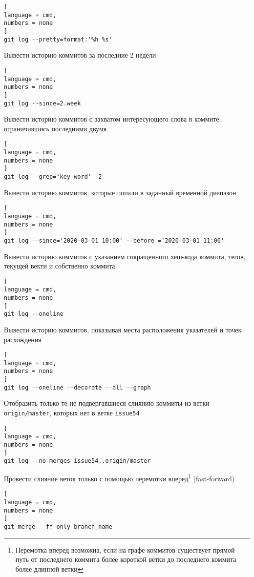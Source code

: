 \documentclass[%
	11pt,
	a4paper,
	utf8,
		]{article}
\begin{document}
\begin{lstlisting}[
language = cmd,
numbers = none
]
git log --pretty=format:'%h %s'
\end{lstlisting}


Вывести историю коммитов за последние 2 недели

\begin{lstlisting}[
language = cmd,
numbers = none
]
git log --since=2.week
\end{lstlisting}


Вывести историю коммитов с захватом интересующего слова в коммите, ограничившись последними двумя

\begin{lstlisting}[
language = cmd,
numbers = none
]
git log --grep='key word' -2
\end{lstlisting}


Вывести историю коммитов, которые попали в заданный временной диапазон

\begin{lstlisting}[
language = cmd,
numbers = none
]
git log --since='2020-03-01 10:00' --before ='2020-03-01 11:00'
\end{lstlisting}


Вывести историю коммитов с указанием сокращенного хеш-кода коммита, тегов, текущей векти и собственно коммита

\begin{lstlisting}[
language = cmd,
numbers = none
]
git log --oneline
\end{lstlisting}


Вывести историю коммитов, показывая места расположения указателей и точек расхождения

\begin{lstlisting}[
language = cmd,
numbers = none
]
git log --oneline --decorate --all --graph
\end{lstlisting}

Отобразить только те не подвергавшиеся слиянию коммиты из ветки \texttt{origin/master}, которых нет в ветке \texttt{issue54}

\begin{lstlisting}[
language = cmd,
numbers = none
]
git log --no-merges issue54..origin/master
\end{lstlisting}

Провести слияние веток только с помощью перемотки вперед\footnote{Перемотка вперед возможна, если на графе коммитов существует прямой путь от последнего коммита более короткой ветки до последнего коммита более длинной ветки} (fast-forward)
\begin{lstlisting}[
language = cmd,
numbers = none
]
git merge --ff-only branch_name
\end{lstlisting}
\end{document}
